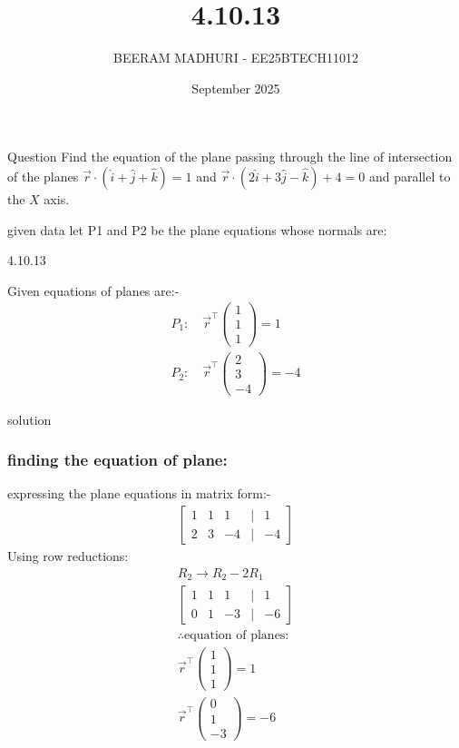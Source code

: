\documentclass{beamer}
\title %
{4.10.13}
\date{September  2025}
\author %
{BEERAM MADHURI - EE25BTECH11012}
\begin{document}
\frame{\titlepage}
\begin{frame}{Question}
Find the equation of the plane passing through the line of intersection of the planes 
$\vec{r} \cdot (\hat{i} + \hat{j} + \hat{k}) = 1$ and $\vec{r} \cdot (2\hat{i} + 3\hat{j} - \hat{k}) + 4 = 0$ and parallel to the $X$ axis.

\end{frame}
 
\begin{frame}{given data}
 let P1 and P2 be the plane equations whose normals are:
\begin{table}[h!]
    \centering
    
    \caption{4.10.13}
    \label{table 4.10.13}
\end{table}
\end{frame}
\begin{frame}
Given equations of planes are:-
\begin{align}
P_1: \quad \vec{r}^\top \begin{pmatrix} 1 \\ 1 \\ 1 \end{pmatrix} = 1\\
P_2: \quad \vec{r}^\top \begin{pmatrix} 2 \\ 3 \\ -4 \end{pmatrix} = -4
\end{align}
\end{frame}
\begin{frame}{solution}
    \frametitle{finding the equation of plane:}
expressing the plane equations in matrix form:-
\begin{align}
\begin{bmatrix}1 & 1 & 1 & | & 1 \\2 & 3 & -4 & | & -4\end{bmatrix}
\end{align}
Using row reductions:
\begin{align}
R_2 \rightarrow R_2 - 2R_1\\
\begin{bmatrix}1 & 1 & 1 & | & 1 \\0 & 1 & -3 & | & -6\end{bmatrix}\\
\therefore \text{equation of planes:}\\
\vec{r}^\top \begin{pmatrix} 1 \\ 1 \\ 1 \end{pmatrix} = 1\\
\vec{r}^\top \begin{pmatrix} 0 \\ 1 \\ -3 \end{pmatrix} = -6
\end{align}
\end{frame}
\end{document}
